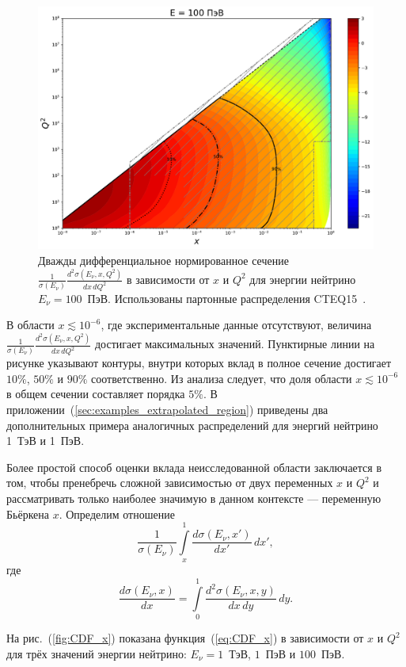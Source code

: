 \begin{figure}[!h]
\centering
\includegraphics[width=0.6\linewidth]{images/NuProp/cdfxq2_cc_proton_CT18ZNNLO_14_100000000.pdf}
\caption{Дважды дифференциальное нормированное сечение 
$\frac{1}{\sigma(E_\nu)}\frac{d^2\sigma(E_\nu,x,Q^2)}{dx\,dQ^2}$ 
в зависимости от $x$ и $Q^2$ для энергии нейтрино $E_{\nu}=100$~ПэВ. 
Использованы партонные распределения CTEQ15~\cite{ncteq15}.}
\label{fig:diff_xsec_100PeV}
\end{figure}

В области $x \lesssim 10^{-6}$, где экспериментальные данные отсутствуют, величина 
$\frac{1}{\sigma(E_\nu)}\frac{d^2\sigma(E_\nu,x,Q^2)}{dx\,dQ^2}$ 
достигает максимальных значений. 
Пунктирные линии на рисунке указывают контуры, внутри которых вклад в полное сечение достигает $10\%$, $50\%$ и $90\%$ соответственно. 
Из анализа следует, что доля области $x \lesssim 10^{-6}$ в общем сечении составляет порядка $5\%$. 
В приложении~(\ref{sec:examples_extrapolated_region}) приведены два дополнительных примера аналогичных распределений для энергий нейтрино 1~ТэВ и 1~ПэВ.

Более простой способ оценки вклада неисследованной области заключается в том, чтобы пренебречь сложной зависимостью от двух переменных $x$ и $Q^2$ и рассматривать только наиболее значимую в данном контексте — переменную Бьёркена $x$. 
Определим отношение
\begin{equation}
\frac{1}{\sigma(E_\nu)}\int\limits_{x}^1 \frac{d\sigma(E_\nu,x')}{dx'}\,dx',
\label{eq:CDF_x}
\end{equation}
где
\[
\frac{d\sigma(E_\nu,x)}{dx} = \int\limits_0^{1} \frac{d^2\sigma(E_\nu,x,y)}{dx\,dy}\,dy.
\]

На рис.~(\ref{fig:CDF_x}) показана функция~(\ref{eq:CDF_x}) в зависимости от $x$ и $Q^2$ для трёх значений энергии нейтрино: $E_{\nu} = 1$~ТэВ, $1$~ПэВ и $100$~ПэВ.

